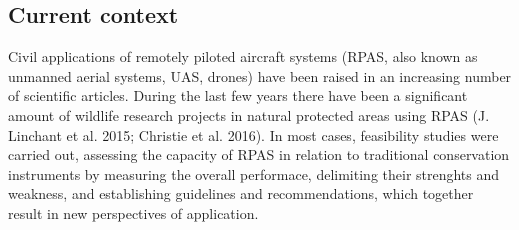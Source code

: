 \documentclass[]{interact}
\theoremstyle{plain}%
\theoremstyle{definition}
\theoremstyle{remark}
\begin{document}
\subsection{Current context}\label{current-context}

Civil applications of remotely piloted aircraft systems (RPAS, also
known as unmanned aerial systems, UAS, drones) have been raised in an
increasing number of scientific articles. During the last few years
there have been a significant amount of wildlife research projects in
natural protected areas using RPAS (J. Linchant et al. 2015; Christie et
al. 2016). In most cases, feasibility studies were carried out,
assessing the capacity of RPAS in relation to traditional conservation
instruments by measuring the overall performace, delimiting their
strenghts and weakness, and establishing guidelines and recommendations,
which together result in new perspectives of application.
\end{document}

